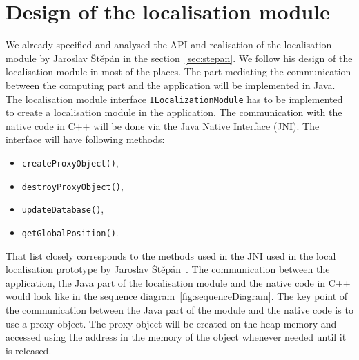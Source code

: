 \documentclass[thesis=B,english]{FITthesis}[2019/12/23]
\begin{document}
    \section{Design of the localisation module}
        We already specified and analysed the API and realisation of the localisation module by Jaroslav Štěpán in the section~\ref{sec:stepan}. We follow his design of the localisation module in most of the places. The part mediating the communication between the computing part and the application will be implemented in Java. The localisation module interface \texttt{ILocalizationModule} has to be implemented to create a localisation module in the application. The communication with the native code in C++ will be done via the Java Native Interface (JNI). The interface will have following methods:
        \begin{itemize}
            \item \texttt{createProxyObject()},
            \item \texttt{destroyProxyObject()},
            \item \texttt{updateDatabase()},
            \item \texttt{getGlobalPosition()}.
        \end{itemize}
        That list closely corresponds to the methods used in the JNI used in the local localisation prototype by Jaroslav Štěpán~\cite{Stepan2019}. The communication between the application, the Java part of the localisation module and the native code in C++ would look like in the sequence diagram~\ref{fig:sequenceDiagram}. The key point of the communication between the Java part of the module and the native code is to use a proxy object. The proxy object will be created on the heap memory and accessed using the address in the memory of the object whenever needed until it is released.
\end{document}

